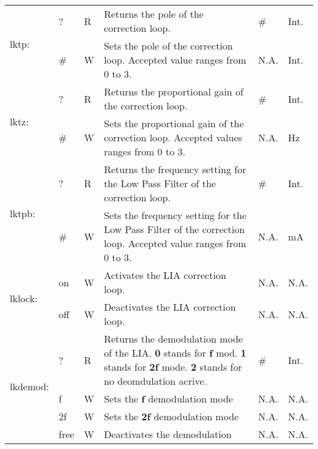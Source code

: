 \begin{center}
\begin{longtable}{| m{} | m{} | m{} | m{} | m{}| m{} |}
    \multirow{2}{0.1\textwidth}{lktp:}  & ? & R & Returns the pole of the correction loop. &  \# & Int. \\
                                        \cline{2-6}
                                        &  \#  & W & Sets the pole of the correction loop. Accepted value ranges from 0 to 3. & N.A. & Int.\\
    \hline
    
    \multirow{2}{0.1\textwidth}{lktz:}  & ? & R & Returns the proportional gain of the correction loop. &  \# & Int. \\
                                        \cline{2-6}
                                        &  \#  & W & Sets the proportional gain of the correction loop. Accepted values ranges from 0 to 3. & N.A. & Hz\\
    \hline
    
    \multirow{2}{0.1\textwidth}{lktpb:}  & ? & R & Returns the frequency setting for the Low Pass Filter of the correction loop. &  \# & Int. \\
                                        \cline{2-6}
                                        &  \#  & W & Sets the frequency setting for the Low Pass Filter of the correction loop. Accepted value ranges from 0 to 3. & N.A. & mA\\
    \hline
    
    \multirow{2}{0.1\textwidth}{lklock:}    & on & W & Activates the LIA correction loop. & N.A. & N.A. \\
                                            \cline{2-6}
                                            &  off  & W & Deactivates the LIA correction loop. & N.A. & N.A.\\
    \hline
    
    \multirow{4}{0.1\textwidth}{lkdemod:}   & ? & R & Returns the demodulation mode of the LIA. 
                                                \newline \textbf{0} stands for \textbf{f} mod.
                                                \newline \textbf{1} stands for \textbf{2f} mode.
                                                \newline \textbf{2} stands for no deomdulation acrive.  &  \# & Int. \\
                                            \cline{2-6}
                                            &  f  & W & Sets the \textbf{f} demodulation mode & N.A. & N.A.\\
                                            \cline{2-6}
                                            &  2f  & W & Sets the \textbf{2f} demodulation mode & N.A. & N.A.\\
                                            \cline{2-6}
                                            &  free  & W & Deactivates the demodulation & N.A. & N.A.\\
    \hline
    

\end{longtable}
\end{center}
